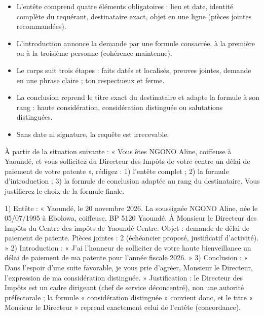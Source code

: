 \documentclass[11pt]{article}
\begin{document}
\begin{aretenir}
\begin{itemize}
\item L'entête comprend quatre éléments obligatoires : lieu et date, identité complète du requérant, destinataire exact, objet en une ligne (pièces jointes recommandées).
\item L'introduction annonce la demande par une formule consacrée, à la première ou à la troisième personne (cohérence maintenue).
\item Le corps suit trois étapes : faits datés et localisés, preuves jointes, demande en une phrase claire ; ton respectueux et ferme.
\item La conclusion reprend le titre exact du destinataire et adapte la formule à son rang : haute considération, considération distinguée ou salutations distinguées.
\item Sans date ni signature, la requête est irrecevable.
\end{itemize}
\end{aretenir}

\begin{exercice}
À partir de la situation suivante : « Vous êtes NGONO Aline, coiffeuse à Yaoundé, et vous sollicitez du Directeur des Impôts de votre centre un délai de paiement de votre patente », rédigez : 1) l'entête complet ; 2) la formule d'introduction ; 3) la formule de conclusion adaptée au rang du destinataire. Vous justifierez le choix de la formule finale.
\end{exercice}

\begin{corrige}
1) Entête : « Yaoundé, le 20 novembre 2026. La soussignée NGONO Aline, née le 05/07/1995 à Ebolowa, coiffeuse, BP 5120 Yaoundé. À Monsieur le Directeur des Impôts du Centre des impôts de Yaoundé Centre. Objet : demande de délai de paiement de patente. Pièces jointes : 2 (échéancier proposé, justificatif d'activité). » 2) Introduction : « J'ai l'honneur de solliciter de votre haute bienveillance un délai de paiement de ma patente pour l'année fiscale 2026. » 3) Conclusion : « Dans l'espoir d'une suite favorable, je vous prie d'agréer, Monsieur le Directeur, l'expression de ma considération distinguée. » Justification : le Directeur des Impôts est un cadre dirigeant (chef de service déconcentré), non une autorité préfectorale ; la formule « considération distinguée » convient donc, et le titre « Monsieur le Directeur » reprend exactement celui de l'entête (concordance).
\end{corrige}
\end{document}
